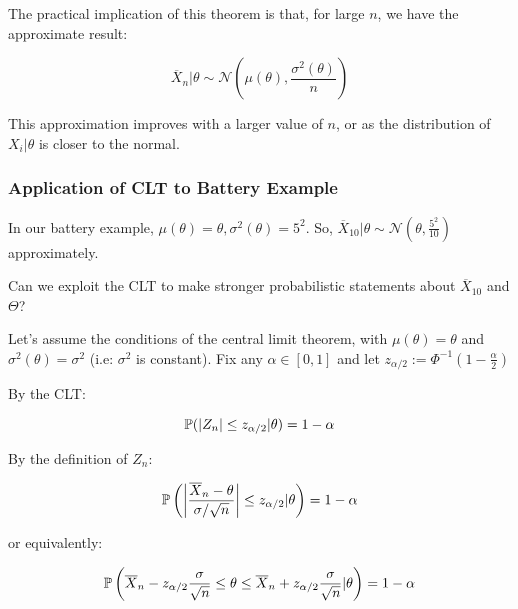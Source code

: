 \documentclass[a4paper]{article}
\begin{document}
                The practical implication of this theorem is that, for large
                $n$, we have the approximate result:

                \[
                    \overline X_n | \theta \sim \mathcal{N}\left(\mu(\theta),
                    \frac{\sigma^2(\theta)}{n}\right)
                \]

                This approximation improves with a larger value of $n$, or as
                the distribution of $X_i | \theta$ is closer to the normal.

            \subsubsection{Application of CLT to Battery Example}
                In our battery example, $\mu(\theta) = \theta, \sigma^2(\theta)
                = 5^2$. So, $\overline X_{10} | \theta \sim
                \mathcal{N}\left(\theta, \frac{5^2}{10}\right)$ approximately.

                Can we exploit the CLT to make stronger probabilistic statements
                about $\overline X_{10}$ and $\Theta$?

                Let's assume the conditions of the central limit theorem, with
                $\mu(\theta) = \theta$ and $\sigma^2(\theta) = \sigma^2$ (i.e:
                $\sigma^2$ is constant). Fix any $\alpha \in [0, 1]$ and let
                $z_{\alpha/2} := \Phi^{-1}\left(1 - \frac{\alpha}{2}\right)$


                By the CLT:

                \[
                    \mathbb{P}(|Z_n| \leq z_{\alpha/2} | \theta) = 1 - \alpha
                \]

                By the definition of $Z_n$:

                \[
                    \mathbb{P}\left(\left|\frac{\overline X_n - \theta}
                    {\sigma/\sqrt{n}}\right| \leq z_{\alpha/2} | \theta\right) =
                    1 - \alpha
                \]

                or equivalently:

                \[
                    \mathbb{P}\left(\overline X_n - z_{\alpha/2} \frac{\sigma}
                    {\sqrt{n}} \leq \theta \leq \overline X_n + z_{\alpha/2}
                    \frac{\sigma}{\sqrt{n}}|\theta\right) = 1 - \alpha
                \]
\end{document}
